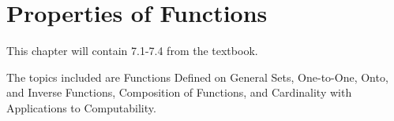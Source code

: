 \documentclass[../discrete.tex]{subfiles}
\begin{document}
\chapter{Properties of Functions}
This chapter will contain 7.1-7.4 from the textbook.

The topics included are Functions Defined on General Sets, One-to-One, Onto, and Inverse Functions, Composition of Functions, and Cardinality with Applications to Computability.
\end{document}
